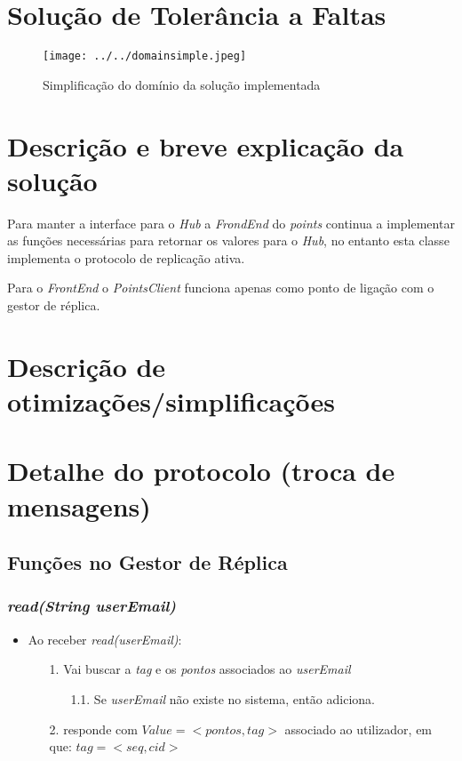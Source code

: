 \documentclass[a4paper]{article}
\begin{document}
\section{Solução de Tolerância a Faltas}
\begin{figure}[h!]
	\texttt{[image: ../../domainsimple.jpeg]}
	\caption{Simplificação do domínio da solução implementada}
	\label{fig:domain}
\end{figure}
\section{Descrição e breve explicação da solução}

Para manter a interface para o \textit{Hub} a	\textit{FrondEnd} do \textit{points} continua a implementar as funções necessárias para retornar os valores para o \textit{Hub}, no entanto esta classe implementa o protocolo de replicação ativa.

Para o \textit{FrontEnd} o \textit{PointsClient} funciona apenas como ponto de ligação com o gestor de réplica.
\section{Descrição de otimizações/simplificações}
\section{Detalhe do protocolo (troca de mensagens)}
\subsection{Funções no Gestor de Réplica}
\subsubsection{\textit{read(String userEmail)}}
\begin{itemize}
\item Ao receber \textit{read(userEmail)}:
\begin{itemize}
\item[1.] Vai buscar a \textit{tag} e os \textit{pontos} associados ao \textit{userEmail}
\begin{itemize}
\item[1.1.] Se \textit{userEmail} não existe no sistema, então adiciona.
\end{itemize}
\item[2.] responde com \textbf{$Value=< pontos, tag >$} associado ao utilizador, em que: $tag=< seq, cid>$
\end{itemize}
\end{itemize}
\end{document}
